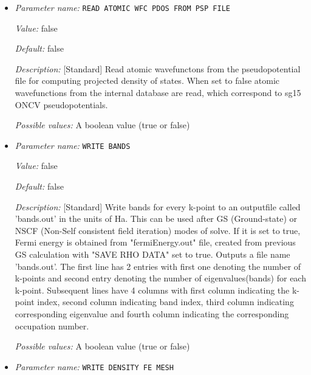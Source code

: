\begin{itemize}
\item {\it Parameter name:} {\tt READ ATOMIC WFC PDOS FROM PSP FILE}
\label{parameters:Post_2dprocessing Options/READ ATOMIC WFC PDOS FROM PSP FILE}
\label{parameters:Post_2dprocessing_20Options/READ_20ATOMIC_20WFC_20PDOS_20FROM_20PSP_20FILE}


{\it Value:} false


{\it Default:} false


{\it Description:} [Standard] Read atomic wavefunctons from the pseudopotential file for computing projected density of states. When set to false atomic wavefunctions from the internal database are read, which correspond to sg15 ONCV pseudopotentials.


{\it Possible values:} A boolean value (true or false)
\item {\it Parameter name:} {\tt WRITE BANDS}
\label{parameters:Post_2dprocessing Options/WRITE BANDS}
\label{parameters:Post_2dprocessing_20Options/WRITE_20BANDS}


{\it Value:} false


{\it Default:} false


{\it Description:} [Standard] Write bands for every k-point to an outputfile called 'bands.out' in the units of Ha. This can be used after GS (Ground-state) or NSCF (Non-Self consistent field iteration) modes of solve. If it is set to true, Fermi energy is obtained from "fermiEnergy.out" file, created from previous GS calculation with "SAVE RHO DATA" set to true. Outputs a file name 'bands.out'. The first line has 2 entries with first one denoting the number of k-points and second entry denoting the number of eigenvalues(bands) for each k-point. Subsequent lines have 4 columns with first column indicating the k-point index, second column indicating band index, third column indicating corresponding eigenvalue and fourth column indicating the corresponding occupation number.


{\it Possible values:} A boolean value (true or false)
\item {\it Parameter name:} {\tt WRITE DENSITY FE MESH}
\label{parameters:Post_2dprocessing Options/WRITE DENSITY FE MESH}
\label{parameters:Post_2dprocessing_20Options/WRITE_20DENSITY_20FE_20MESH}



\end{itemize}
